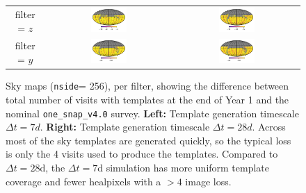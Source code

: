 \documentclass[preprintm,linenumbers]{aastex631}
\newcommand{\baseline}{\texttt{one\_snap\_v4.0}\xspace}
\newcommand{\nside}{\texttt{nside}\xspace}
\begin{document}
\begin{figure}
\begin{tabular}{c c c}
				
				filter = $z$ & \includegraphics[align=c,width=0.3\textwidth]{results/skymaps/skymaps_delta_first_year_one_snap_v4_0_10yrs_db_noDD_noTwi_CountMetric_doAllTemplateMetrics_reduceCount_z_7_noDD_noTwi} &			
				\includegraphics[align=c,width=0.3\textwidth]{results/skymaps/skymaps_delta_first_year_one_snap_v4_0_10yrs_db_noDD_noTwi_CountMetric_doAllTemplateMetrics_reduceCount_z_28_noDD_noTwi} \\
				
				filter = $y$ & \includegraphics[align=c,width=0.3\textwidth]{results/skymaps/skymaps_delta_first_year_one_snap_v4_0_10yrs_db_noDD_noTwi_CountMetric_doAllTemplateMetrics_reduceCount_y_7_noDD_noTwi} &				
				\includegraphics[align=c,width=0.3\textwidth]{results/skymaps/skymaps_delta_first_year_one_snap_v4_0_10yrs_db_noDD_noTwi_CountMetric_doAllTemplateMetrics_reduceCount_y_28_noDD_noTwi} \\
				
			\end{tabular}
			\caption{Sky maps (\nside = 256), per filter, showing the  difference between total number of visits with templates at the end of Year 1 and the nominal \baseline survey. \textbf{Left:} Template generation timescale $\Delta t = 7 \si{d}$.  \textbf{Right:} Template generation timescale $\Delta t = 28 \si{d}$. Across most of the sky templates are generated quickly, so the typical loss is only the 4 visits used to produce the templates. 
   Compared to $\Delta t = 28$d, the $\Delta t = 7$d simulation has more uniform template coverage and fewer healpixels with a $>4$ image loss.  
			}
			\label{fig:template_skymaps_delta-7_28days}
		\end{figure}
\end{document}
